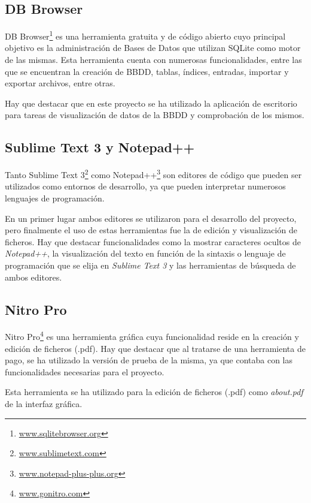 \subsection{DB Browser}\label{db_browser}
DB Browser\footnote{\href{https://sqlitebrowser.org/}{www.sqlitebrowser.org}} es una herramienta gratuita y de código abierto cuyo principal objetivo es la administración de Bases de Datos que utilizan SQLite como motor de las mismas. Esta herramienta cuenta con numerosas funcionalidades, entre las que se encuentran la creación de BBDD, tablas, índices, entradas, importar y exportar archivos, entre otras.

Hay que destacar que en este proyecto se ha utilizado la aplicación de escritorio para tareas de visualización de datos de la BBDD y comprobación de los mismos.


\subsection{Sublime Text 3 y Notepad++}\label{sublime_text_3_y_notepad++}
Tanto Sublime Text 3\footnote{\href{https://www.sublimetext.com/}{www.sublimetext.com}} como Notepad++\footnote{\href{https://notepad-plus-plus.org/}{www.notepad-plus-plus.org}} son editores de código que pueden ser utilizados como entornos de desarrollo, ya que pueden interpretar numerosos lenguajes de programación. 

En un primer lugar ambos editores se utilizaron para el desarrollo del proyecto, pero finalmente el uso de estas herramientas fue la de edición y visualización de ficheros. Hay que destacar funcionalidades como la mostrar caracteres ocultos de \emph{Notepad++}, la visualización del texto en función de la sintaxis o lenguaje de programación que se elija en \emph{Sublime Text 3} y las herramientas de búsqueda de ambos editores.

\subsection{Nitro Pro}\label{nitro_pro}
Nitro Pro\footnote{\href{https://www.gonitro.com/es/}{www.gonitro.com}} es una herramienta gráfica cuya funcionalidad reside en la creación y edición de ficheros (.pdf). Hay que destacar que al tratarse de una herramienta de pago, se ha utilizado la versión de prueba de la misma, ya que contaba con las funcionalidades necesarias para el proyecto.

Esta herramienta se ha utilizado para la edición de ficheros (.pdf) como \emph{about.pdf} de la interfaz gráfica.


